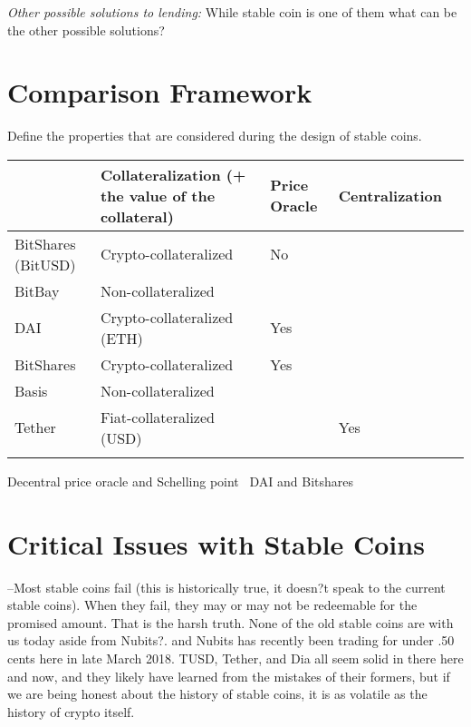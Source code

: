 \textit{Other possible solutions to lending:} While stable coin is one of them what can be the other possible solutions?

\section{Comparison Framework} %
Define the properties that are considered during the design of stable coins.
~
\begin{table}[]
	\begin{tabular}{|l|l|l|l|l|}
		\hline
		& Collateralization (+ the value of the collateral) & Price Oracle & Centralization  \\ \hline
		BitShares (BitUSD) &  Crypto-collateralized &  No & \\ \hline
		BitBay & Non-collateralized & &  \\ \hline
		 DAI& Crypto-collateralized (ETH)  &  Yes& \\ \hline
		 BitShares&Crypto-collateralized&Yes&\\ \hline
		 Basis&Non-collateralized&& \\ \hline
		 Tether & Fiat-collateralized (USD) & & Yes \\ \hline
		  &&& \\ \hline
	\end{tabular}
\end{table}

Decentral price oracle and Schelling point~\cite{cryptoinsider}
DAI and Bitshares~\cite{cryptoinsider}

\section{Critical Issues with Stable Coins}

--Most stable coins fail (this is historically true, it doesn?t speak to the current stable coins). When they fail, they may or may not be redeemable for the promised amount. That is the harsh truth. None of the old stable coins are with us today aside from Nubits?. and Nubits has recently been trading for under .50 cents here in late March 2018. TUSD, Tether, and Dia all seem solid in there here and now, and they likely have learned from the mistakes of their formers, but if we are being honest about the history of stable coins, it is as volatile as the history of crypto itself.


